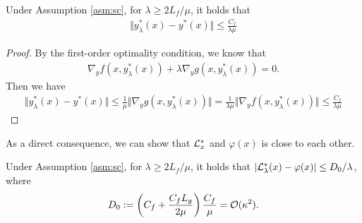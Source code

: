 
\begin{lem} \label{lem:yy-lambda}
    Under Assumption \ref{asm:sc}, for $\lambda \ge 2L_f/ \mu$, it holds that 
    \begin{align*}
        \Vert y_{\lambda}^*(x) - y^*(x) \Vert \le \frac{C_f}{\lambda \mu}
    \end{align*}
\end{lem}

\begin{proof}
By the first-order optimality condition, we know that
\begin{align*}
    \nabla_y f(x, y_{\lambda}^*(x)) + \lambda \nabla_y g(x,y_{\lambda}^*(x))  = 0.
\end{align*}
Then we have
\begin{align*}
    \Vert y_{\lambda}^*(x) - y^*(x) \Vert 
    \le \frac{1}{\mu} \Vert \nabla_y g(x,y_{\lambda}^*(x)) \Vert = \frac{1}{\lambda \mu} \Vert \nabla_y f(x,y_{\lambda}^*(x)) \Vert \le \frac{C_f}{\lambda \mu}
\end{align*}
\end{proof}

As a direct consequence, we can show that ${\mathcal{L}}_{x}^*$ and $\varphi(x)$ is close to each other.
\begin{lem} \label{lem:F-Lag-close}
 Under Assumption \ref{asm:sc}, for $\lambda \ge 2L_f / \mu$, it holds that $\vert {\mathcal{L}}_{\lambda}^*(x) - \varphi(x) \vert \le D_0/ \lambda$, where
 \begin{align*}
     D_0 : = \left(C_f + \frac{C_f L_g}{2 \mu} \right) \frac{C_f }{\mu} = {\mathcal{O}}(\kappa^2).
 \end{align*}
\end{lem}


